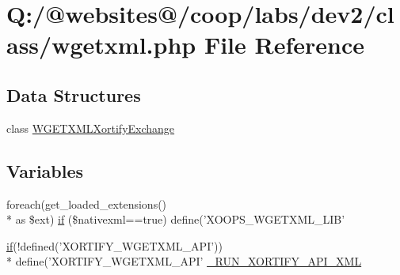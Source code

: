 \hypertarget{wgetxml_8php}{\section{Q\-:/@websites@/coop/labs/dev2/class/wgetxml.php File Reference}
\label{wgetxml_8php}
}
\subsection*{Data Structures}
\begin{DoxyCompactItemize}
\item 
class \hyperlink{class_w_g_e_t_x_m_l_xortify_exchange}{W\-G\-E\-T\-X\-M\-L\-Xortify\-Exchange}
\end{DoxyCompactItemize}
\subsection*{Variables}
\begin{DoxyCompactItemize}
\item 
foreach(get\-\_\-loaded\-\_\-extensions() \\*
as \$ext) \hyperlink{wgetxml_8php_a121ad903444481b9834116cef5ea2f4d}{if} (\$nativexml==true) define('X\-O\-O\-P\-S\-\_\-\-W\-G\-E\-T\-X\-M\-L\-\_\-\-L\-I\-B'
\item 
\hyperlink{index_8php_ae2ccdf355624402b65fc2226f2a661cd}{if}(!defined('X\-O\-R\-T\-I\-F\-Y\-\_\-\-W\-G\-E\-T\-X\-M\-L\-\_\-\-A\-P\-I')) \\*
define('X\-O\-R\-T\-I\-F\-Y\-\_\-\-W\-G\-E\-T\-X\-M\-L\-\_\-\-A\-P\-I' \hyperlink{wgetxml_8php_a02a206e6186196633813b6d0fcab1556}{\-\_\-\-R\-U\-N\-\_\-\-X\-O\-R\-T\-I\-F\-Y\-\_\-\-A\-P\-I\-\_\-\-X\-M\-L}
\end{DoxyCompactItemize}


